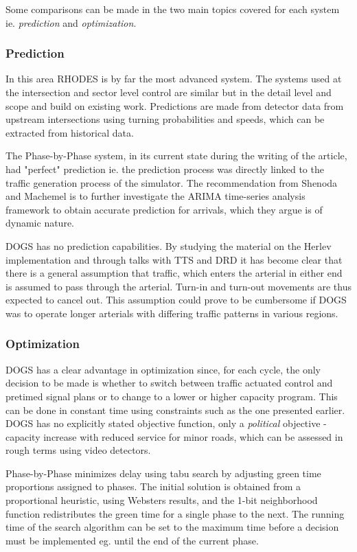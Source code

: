 Some comparisons can be made in the two main topics covered for each
system ie. \textit{prediction} and \textit{optimization}.

\subsubsection*{Prediction}

In this area RHODES is by far the most advanced system. The systems
used at the intersection and sector level control are similar but in
the detail level and scope and build on existing work. Predictions are
made from detector data from upstream intersections using turning
probabilities and speeds, which can be extracted from historical data.

The Phase-by-Phase system, in its current state during the writing of
the article, had "perfect" prediction ie. the prediction process was
directly linked to the traffic generation process of the
simulator. The recommendation from Shenoda and Machemel is to further
investigate the ARIMA time-series analysis framework to obtain
accurate prediction for arrivals, which they argue is of dynamic
nature.

DOGS has no prediction capabilities. By studying the material on the
Herlev implementation and through talks with TTS and DRD it has become
clear that there is a general assumption that traffic, which enters
the arterial in either end is assumed to pass through the
arterial. Turn-in and turn-out movements are thus expected to cancel
out. This assumption could prove to be cumbersome if DOGS was to
operate longer arterials with differing traffic patterns in various
regions.

\subsubsection*{Optimization}

DOGS has a clear advantage in optimization since, for each cycle, the
only decision to be made is whether to switch between traffic actuated
control and pretimed signal plans or to change to a lower or higher
capacity program. This can be done in constant time using constraints
such as the one presented earlier. DOGS has no explicitly stated
objective function, only a \textit{political} objective - capacity
increase with reduced service for minor roads, which can be assessed
in rough terms using video detectors.

Phase-by-Phase minimizes delay using tabu search by adjusting green
time proportions assigned to phases. The initial solution is obtained
from a proportional heuristic, using Websters results, and the 1-bit
neighborhood function redistributes the green time for a single phase
to the next.  The running time of the search algorithm can be set to
the maximum time before a decision must be implemented eg. until the
end of the current phase.

